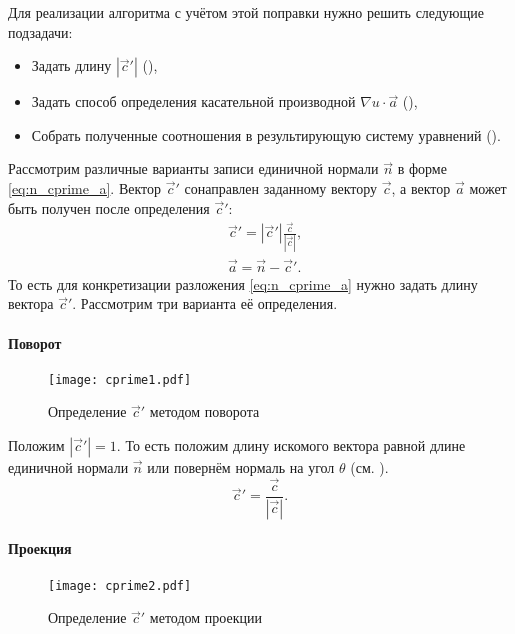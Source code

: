 Для реализации алгоритма с учётом этой поправки нужно решить следующие подзадачи:
\begin{itemize}
\item Задать длину $|\vec c'|$ (),
\item Задать способ определения касательной производной $\nabla u\cdot \vec a$ (),
\item Собрать полученные соотношения в результирующую систему уравнений ().
\end{itemize}

\label{sec:cprime_a}
Рассмотрим различные варианты записи единичной нормали $\vec n$ в форме \cref{eq:n_cprime_a}.
Вектор $\vec c'$ сонаправлен заданному вектору $\vec c$, а вектор $\vec a$ может быть получен после определения $\vec c'$:
\begin{align*}
&\vec c' = |\vec c'| \frac{\vec c}{|\vec c|},\\
&\vec a = \vec n - \vec c'.
\end{align*}
То есть для конкретизации разложения  \cref{eq:n_cprime_a} нужно задать длину вектора $\vec c'$.
Рассмотрим три варианта её определения.

\paragraph{Поворот}

\begin{figure}[h!]
\centering
\texttt{[image: cprime1.pdf]}
\caption{Определение $\vec c'$ методом поворота}
\label{fig:cprime1}
\end{figure}

Положим $|\vec c'| = 1$. То есть положим длину искомого вектора равной длине единичной нормали $\vec n$ или повернём нормаль на угол $\theta$ (см. ).
\begin{equation*}
\vec c' =  \frac{\vec c}{|\vec c|}.
\end{equation*}

\paragraph{Проекция}

\begin{figure}[h!]
\centering
\texttt{[image: cprime2.pdf]}
\caption{Определение $\vec c'$ методом проекции}
\label{fig:cprime2}
\end{figure}

